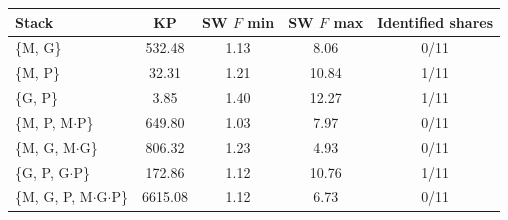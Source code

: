 \begin{tabular}{@{}lcccc@{}}
\toprule
Stack & KP & SW $F$ min & SW $F$ max & Identified shares \\
\midrule
\{M, G\} & 532.48 & 1.13 & 8.06 & 0/11 \\
\{M, P\} & 32.31 & 1.21 & 10.84 & 1/11 \\
\{G, P\} & 3.85 & 1.40 & 12.27 & 1/11 \\
\addlinespace
\{M, P, M$\cdot$P\} & 649.80 & 1.03 & 7.97 & 0/11 \\
\{M, G, M$\cdot$G\} & 806.32 & 1.23 & 4.93 & 0/11 \\
\{G, P, G$\cdot$P\} & 172.86 & 1.12 & 10.76 & 1/11 \\
\{M, G, P, M$\cdot$G$\cdot$P\} & 6615.08 & 1.12 & 6.73 & 0/11 \\
\bottomrule
\end{tabular}
